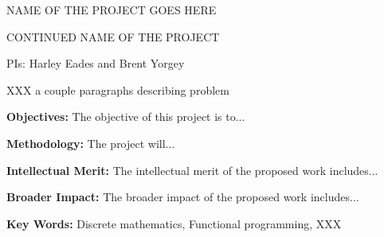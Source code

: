 \centerline{\Large NAME OF THE PROJECT GOES HERE}
\vspace{1ex}
\centerline{\Large CONTINUED NAME OF THE PROJECT}
\vspace{3ex}
\centerline{\large PIs: Harley Eades and Brent Yorgey}
\vspace{3ex}

\begin{comment}
  The proposal must contain a summary of the proposed activity suitable
  for publication, not more than one page in length. It should not be an
  abstract of the proposal, but rather a self-contained description of the
  activity that would result if the proposal were funded. The summary
  should be written in the third person and include a statement of
  objectives and methods to be employed. It must clearly address in
  separate statements (within the one-page summary): (1) the intellectual
  merit of the proposed activity; and (2) the broader impacts resulting
  from the proposed activity. (See Chapter III for further descriptive
  information on the NSF merit review criteria.) It should be informative
  to other persons working in the same or related fields and, insofar as
  possible, understandable to a scientifically or technically literate lay
  reader. Proposals that do not separately address both merit review
  criteria within the one page Project Summary will be returned without
  review.
\end{comment}

XXX a couple paragraphs describing problem

{\bf Objectives: } The objective of this project is to...

{\bf Methodology: } The project will...

{\bf Intellectual Merit:} The intellectual merit of the proposed work
includes...

{\bf Broader Impact: } The broader impact of the proposed work
includes...

{\bf Key Words:} Discrete mathematics, Functional programming, XXX


